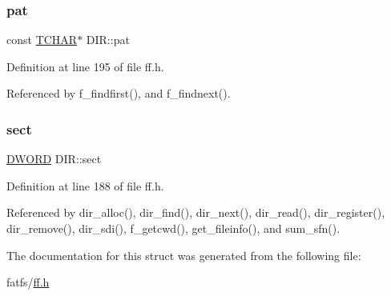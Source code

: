 \mbox{\label{structDIR_a1f636884096de91deb97f59209d60e96}} 
\subsubsection{\texorpdfstring{pat}{pat}}
{\footnotesize\ttfamily const \hyperlink{ff_8h_a03bdb8ce5895c7e261aadc2529637546}{T\+C\+H\+AR}$\ast$ D\+I\+R\+::pat}



Definition at line 195 of file ff.\+h.



Referenced by f\+\_\+findfirst(), and f\+\_\+findnext().

\mbox{\label{structDIR_ad01fcc812ed0dad11a593574336adc9e}} 
\subsubsection{\texorpdfstring{sect}{sect}}
{\footnotesize\ttfamily \hyperlink{integer_8h_ad342ac907eb044443153a22f964bf0af}{D\+W\+O\+RD} D\+I\+R\+::sect}



Definition at line 188 of file ff.\+h.



Referenced by dir\+\_\+alloc(), dir\+\_\+find(), dir\+\_\+next(), dir\+\_\+read(), dir\+\_\+register(), dir\+\_\+remove(), dir\+\_\+sdi(), f\+\_\+getcwd(), get\+\_\+fileinfo(), and sum\+\_\+sfn().



The documentation for this struct was generated from the following file\+:\begin{DoxyCompactItemize}
\item 
fatfs/\hyperlink{ff_8h}{ff.\+h}\end{DoxyCompactItemize}
